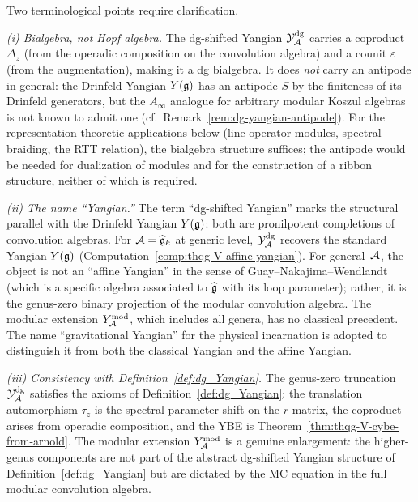 \begin{remark}
Two terminological points require clarification.

\smallskip\noindent
\emph{(i) Bialgebra, not Hopf algebra.}
The dg-shifted Yangian $\mathcal{Y}^{\mathrm{dg}}_{\mathcal{A}}$ carries a coproduct
$\Delta_z$ (from the operadic composition on the
convolution algebra) and a counit $\varepsilon$
(from the augmentation), making it a dg bialgebra.
It does \emph{not} carry an antipode in general: the
Drinfeld Yangian $Y(\mathfrak{g})$ has an antipode $S$ by the
finiteness of its Drinfeld generators, but the $A_\infty$
analogue for arbitrary modular Koszul algebras is not
known to admit one (cf.\
Remark~\ref{rem:dg-yangian-antipode}). For the
representation-theoretic applications below
(line-operator modules, spectral braiding, the RTT
relation), the bialgebra structure suffices; the
antipode would be needed for dualization of modules
and for the construction of a ribbon structure, neither of
which is required.

\smallskip\noindent
\emph{(ii) The name ``Yangian.''}
The term ``dg-shifted Yangian'' marks the structural
parallel with the Drinfeld Yangian $Y(\mathfrak{g})$: both are
pronilpotent completions of convolution algebras. For
$\mathcal{A} = \widehat{\mathfrak{g}}_k$ at generic level,
$\mathcal{Y}^{\mathrm{dg}}_{\mathcal{A}}$ recovers the standard Yangian $Y(\mathfrak{g})$
(Computation~\ref{comp:thqg-V-affine-yangian}). For
general~$\mathcal{A}$, the object is not an ``affine Yangian''
in the sense of Guay--Nakajima--Wendlandt (which is a
specific algebra associated to $\widehat{\mathfrak{g}}$ with its
loop parameter); rather, it is the genus-zero binary
projection of the modular convolution algebra. The
modular extension $Y^{\mathrm{mod}}_{\mathcal{A}}$, which includes all genera,
has no classical precedent. The name ``gravitational
Yangian'' for the physical incarnation is adopted to
distinguish it from both the classical Yangian and
the affine Yangian.

\smallskip\noindent
\emph{(iii) Consistency with
Definition~\textup{\ref{def:dg_Yangian}}.}
The genus-zero truncation $\mathcal{Y}^{\mathrm{dg}}_{\mathcal{A}}$ satisfies the axioms of
Definition~\ref{def:dg_Yangian}: the translation automorphism
$\tau_z$ is the spectral-parameter shift on the $r$-matrix,
the coproduct arises from operadic composition, and the YBE is
Theorem~\ref{thm:thqg-V-cybe-from-arnold}. The modular
extension $Y^{\mathrm{mod}}_{\mathcal{A}}$ is a genuine enlargement: the higher-genus
components are not part of the abstract dg-shifted Yangian
structure of Definition~\ref{def:dg_Yangian} but are dictated
by the MC equation in the full modular convolution algebra.
\end{remark}

